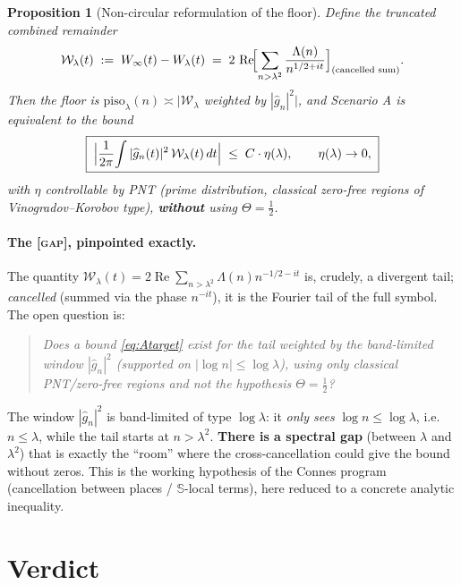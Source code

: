 \documentclass[11pt]{article}
\newcommand{\GAP}{\textcolor{red!75!black}{\textsc{[gap]}}}
\theoremstyle{plain}
\newtheorem{proposition}{Proposition}
\theoremstyle{definition}
\newcommand{\Lam}{\Lambda}
\DeclareMathOperator{\Real}{Re}
\newcommand{\half}{\tfrac12}
\begin{document}
\begin{proposition}[Non-circular reformulation of the floor]\label{prop:noncirc}
Define the truncated combined remainder
\[
  \mathcal{W}_\lambda(t)\;:=\;W_\infty(t)-W_\lambda(t)
  \;=\;2\,\Real\!\Bigl[\sum_{n>\lambda^2}\frac{\Lam(n)}{n^{1/2+it}}\Bigr]_{\text{(cancelled sum)}} .
\]
Then the floor is $\mathrm{piso}_\lambda(n)\asymp|\mathcal W_\lambda$ weighted by
$|\widehat g_n|^2|$, and Scenario A is equivalent to the bound
\begin{equation}\label{eq:Atarget}
  \boxed{\;\Bigl|\frac1{2\pi}\!\int |\widehat g_n(t)|^2\,\mathcal W_\lambda(t)\,dt\Bigr|
  \;\le\; C\cdot\eta(\lambda),\qquad \eta(\lambda)\to0,\;}
\end{equation}
with $\eta$ \emph{controllable by PNT} (prime distribution, classical zero-free
regions of Vinogradov--Korobov type), \textbf{without} using $\Theta=\half$.
\end{proposition}

\paragraph{The \GAP, pinpointed exactly.}
The quantity $\mathcal W_\lambda(t)=2\Real\sum_{n>\lambda^2}\Lam(n)n^{-1/2-it}$ is,
crudely, a divergent tail; \emph{cancelled} (summed via the phase $n^{-it}$),
it is the Fourier tail of the full symbol. The open question is:
\begin{quote}\itshape
Does a bound \eqref{eq:Atarget} exist for the tail \emph{weighted by the
band-limited window} $|\widehat g_n|^2$ (supported on $|\log n|\le\log\lambda$), using
only classical PNT/zero-free regions and \emph{not} the hypothesis
$\Theta=\half$?
\end{quote}
The window $|\widehat g_n|^2$ is band-limited of type $\log\lambda$: it \emph{only sees}
$\log n\le\log\lambda$, i.e.\ $n\le\lambda$, while the tail starts at $n>\lambda^2$.
\textbf{There is a spectral gap} (between $\lambda$ and $\lambda^2$) that is exactly the
``room'' where the cross-cancellation could give the bound without zeros. This is the
working hypothesis of the Connes program (cancellation between places /
$\mathbb{S}$-local terms), here reduced to a concrete analytic inequality.

\section{Verdict}\label{sec:verdict}
\end{document}
